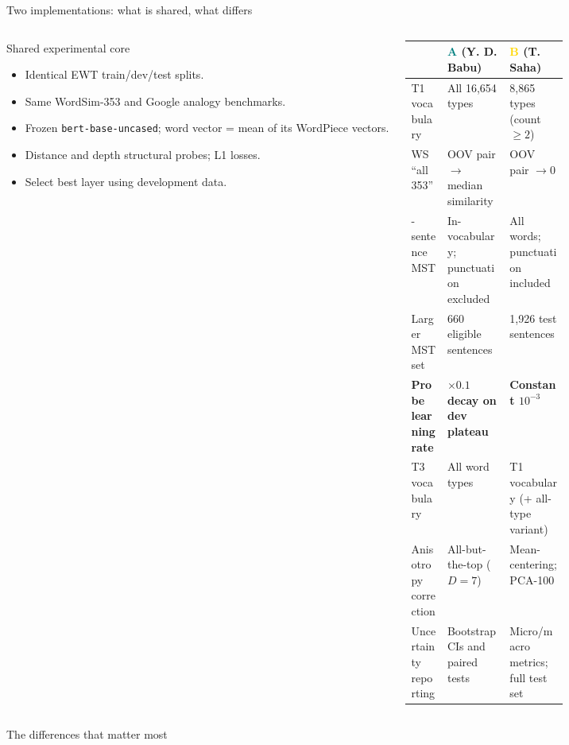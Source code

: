 \documentclass[aspectratio=169,9pt,t]{beamer}
\newcommand{\A}{\textcolor{Teal}{\bfseries A}}
\newcommand{\B}{\textcolor{Gold}{\bfseries B}}
\newcommand{\tightitem}{\setlength{\itemsep}{0.12em}\setlength{\parskip}{0pt}\setlength{\topsep}{0.08em}}
\begin{document}
\begin{frame}{Two implementations: what is shared, what differs}
\begin{columns}[T,onlytextwidth]
\begin{block}{Shared experimental core}
\small
\begin{itemize}\tightitem
\item Identical EWT train/dev/test splits.
\item Same WordSim-353 and Google analogy benchmarks.
\item Frozen \texttt{bert-base-uncased}; word vector = mean of its WordPiece vectors.
\item Distance and depth structural probes; L1 losses.
\item Select best layer using development data.
\end{itemize}
\end{block}
\footnotesize
\begin{tabularx}{\linewidth}{@{}>{\raggedright\arraybackslash}p{0.23\linewidth}XX@{}}
\toprule
 & \A{} (Y. D. Babu) & \B{} (T. Saha) \\
\midrule
T1 vocabulary & All 16,654 types & 8,865 types (count $\geq 2$) \\
WS ``all 353'' & OOV pair $\to$ median similarity & OOV pair $\to 0$ \\
20-sentence MST & \shortstack[l]{In-vocabulary;\\punctuation excluded} & \shortstack[l]{All words;\\punctuation included} \\
Larger MST set & 660 eligible sentences & 1,926 test sentences \\
\textbf{Probe learning rate} & \textbf{$\times 0.1$ decay on dev plateau} & \textbf{Constant $10^{-3}$} \\
T3 vocabulary & All word types & T1 vocabulary (+ all-type variant) \\
Anisotropy correction & All-but-the-top ($D=7$) & Mean-centering; PCA-100 \\
Uncertainty reporting & Bootstrap CIs and paired tests & Micro/macro metrics; full test set \\
\bottomrule
\end{tabularx}
\end{columns}
\vspace{0.3em}
\begin{alertblock}{The differences that matter most}

\end{alertblock}
\end{frame}
\end{document}
